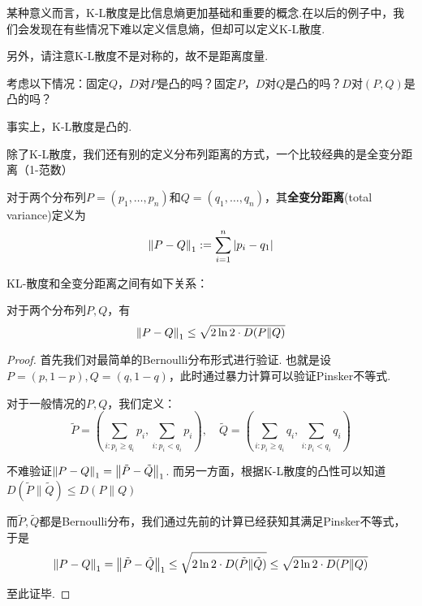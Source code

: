 某种意义而言，K-L散度是比信息熵更加基础和重要的概念.在以后的例子中，我们会发现在有些情况下难以定义信息熵，但却可以定义K-L散度. 

另外，请注意K-L散度不是对称的，故不是距离度量.

\begin{example}[K-L散度的凸性]
    考虑以下情况：固定$Q$，$D$对$P$是凸的吗？固定$P$，$D$对$Q$是凸的吗？$D$对$(P, Q)$是凸的吗？
\end{example} 
\begin{solution}
    事实上，K-L散度是凸的.
\end{solution}

除了K-L散度，我们还有别的定义分布列距离的方式，一个比较经典的是全变分距离（1-范数）
\begin{definition}[全变分距离]
    对于两个分布列$P=(p_1,\dots, p_n)$和$Q=(q_1,\dots, q_n)$，其\textbf{全变分距离}(total variance)定义为 
    \[
    \left\lVert P-Q\right\rVert_1 := \sum_{i=1}^n \left\vert p_i - q_1\right\vert
    \]
\end{definition}

KL-散度和全变分距离之间有如下关系：
\begin{theorem}[Pinsker不等式]
    对于两个分布列$P, Q$，有 
    \[
    \left\lVert P - Q\right\rVert_1 \le \sqrt{2\ln 2\cdot D(P \| Q)}
    \]
\end{theorem}
\begin{proof}
    首先我们对最简单的Bernoulli分布形式进行验证.  也就是设$P=(p, 1-p), Q = (q, 1-q)$，此时通过暴力计算可以验证Pinsker不等式.  

    对于一般情况的$P,Q$，我们定义：
    \[
    \tilde{P} = \left(
        \sum_{i:p_i \ge q_i} p_i, 
        \sum_{i:p_i < q_i} p_i
    \right), \quad 
    \tilde{Q} = \left(
        \sum_{i:p_i \ge q_i} q_i, 
        \sum_{i:p_i < q_i} q_i 
    \right)
    \]

    不难验证$\left\lVert P - Q\right\rVert_1 = \left\lVert\tilde{P} - \tilde{Q}\right\rVert_1$. 而另一方面，根据K-L散度的凸性可以知道$D(\tilde{P} \| \tilde{Q}) \le D(P \| Q) $

    而$\tilde{P}, \tilde{Q}$都是Bernoulli分布，我们通过先前的计算已经获知其满足Pinsker不等式，于是 
    \[
    \left\lVert P - Q\right\rVert_1 = \left\lVert\tilde{P} - \tilde{Q}\right\rVert_1 \le \sqrt{2 \ln 2\cdot D(\tilde{P} \| \tilde{Q})} \le \sqrt{2 \ln 2\cdot D(P \| Q)}
    \]

    至此证毕. 
\end{proof}

